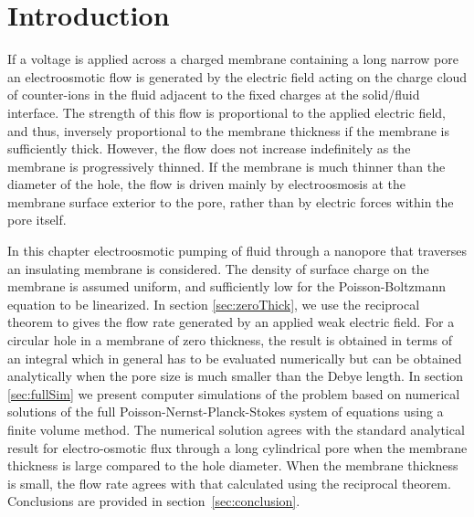 \newtheorem{lemma}{Lemma}
\newtheorem{corollary}{Corollary}

\section{Introduction}
\label{sec:zero_thickness_intro}
If a voltage is applied across a charged membrane containing a long narrow pore an electroosmotic flow is generated by the electric field acting on the charge cloud of counter-ions in the fluid adjacent to the fixed charges at the solid\//fluid interface. The strength of this flow is proportional to the applied electric field, and thus, inversely proportional to the membrane thickness if the membrane is sufficiently thick. However, the flow does not increase indefinitely as the membrane is progressively thinned. If the membrane is much thinner than the diameter of the hole, the flow is driven mainly by electroosmosis at the membrane surface exterior to the pore, rather than by electric forces within the pore itself. 

In this chapter electroosmotic pumping of fluid through a nanopore that traverses an insulating membrane is considered. The density of surface charge on the membrane is assumed uniform, and sufficiently low for the Poisson-Boltzmann equation to be linearized. In section \ref{sec:zeroThick}, we use the reciprocal theorem to gives the flow rate generated by an applied weak electric field. For a circular hole in a membrane of zero thickness, the result is obtained in terms of an integral which in general has to be evaluated numerically but can be obtained analytically when the pore size is much smaller than the Debye length.  In section \ref{sec:fullSim} we present computer simulations of the problem based on numerical solutions of the full Poisson-Nernst-Planck-Stokes system of equations using a finite volume method. The numerical solution agrees with the standard analytical result for electro-osmotic flux through a long cylindrical pore when the membrane thickness is large compared to the hole diameter. When the membrane thickness is small, the flow rate agrees with that calculated using the reciprocal theorem. Conclusions are provided in section~\ref{sec:conclusion}. 

